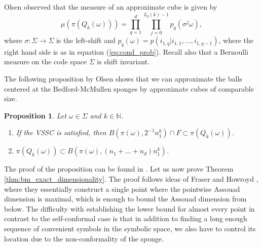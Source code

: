 \documentclass{PRM}
\newcommand{\field}[1]{\mathbb{#1}}
\newcommand{\N}{\field{N}}
\theoremstyle{plain}
\newtheorem{prop}[thm]{Proposition}
\theoremstyle{definition}
\theoremstyle{remark}
\begin{document}
Olsen \cite{O} observed that the measure of an approximate cube is given by
\begin{equation}\label{eq:appr_cube_msr}
    \mu(\pi(Q_k(\omega)))=\prod_{q=1}^d\prod_{j=0}^{L_q(k)-1}p_q(\sigma^j\omega),
\end{equation}
where $\sigma:\Sigma \to \Sigma$ is the left-shift and $p_q(\omega)=p(i_{1,q}|i_{1,1},\ldots,i_{1,q-1})$, where the right hand side is as in equation (\ref{eq:cond_prob}). Recall also that a Bernoulli measure on the code space $\Sigma$ is shift invariant.

The following proposition by Olsen shows that we can approximate the balls centered at the Bedford-McMullen sponges by approximate cubes of comparable size.

\begin{prop}\label{prop:olsenvssc}
Let $\omega\in\Sigma$ and $k\in\N$.
\begin{enumerate}
    \item If the VSSC is satisfied, then $B(\pi(\omega),2^{-1}n_1^k)\cap F\subset \pi(Q_k(\omega))$.
    \item  $\pi(Q_k(\omega))\subset B(\pi(\omega),(n_1+\ldots+n_d)n_1^k)$.
\end{enumerate}
\end{prop}
The proof of the proposition can be found in \cite[Proposition 6.2.1]{O}. Let us now prove Theorem \ref{thm:bm_exact_dimensionality}. The proof follows ideas of Fraser and Howroyd \cite[Theorem 2.6]{FH}, where they essentially construct a single point where the pointwise Assouad dimension is maximal, which is enough to bound the Assouad dimension from below. The difficulty with establishing the lower bound for almost every point in contrast to the self-conformal case is that in addition to finding a long enough sequence of convenient symbols in the symbolic space, we also have to control its location due to the non-conformality of the sponge.
\end{document}
